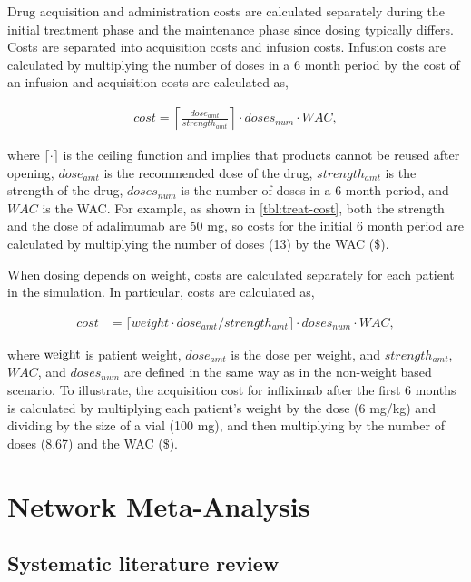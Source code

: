 \documentclass[11pt,final,fleqn]{article}\usepackage[]{graphicx}\usepackage[]{color}
\theoremstyle{plain}
\begin{document}
\begin{appendices}
Drug acquisition and administration costs are calculated separately during the initial treatment phase and the maintenance phase since dosing typically differs. Costs are separated into acquisition costs and infusion costs. Infusion costs are calculated by multiplying the number of doses in a 6 month period by the cost of an infusion and acquisition costs are calculated as,

\begin{align}
cost = \left\lceil\frac{dose_{amt}}{strength_{amt}}\right\rceil \cdot doses_{num} \cdot WAC,
\end{align}

where $\lceil\cdot\rceil$ is the ceiling function and implies that products cannot be reused after opening, $dose_{amt}$ is the recommended dose of the drug, $strength_{amt}$ is the strength of the drug, $doses_{num}$ is the number of doses in a 6 month period, and $WAC$ is the WAC. For example, as shown in \autoref{tbl:treat-cost}, both the strength and the dose of adalimumab are 50 mg, so costs for the initial 6 month period are calculated by multiplying the number of doses (13) by the WAC (\$).

When dosing depends on weight, costs are calculated separately for each patient in the simulation. In particular, costs are calculated as,

\begin{align}
cost &= \lceil weight \cdot dose_{amt}/strength_{amt}\rceil \cdot doses_{num} \cdot WAC,
\end{align}

where $\rm{weight}$ is patient weight, $dose_{amt}$ is the dose per weight, and $strength_{amt}$, $WAC$, and $doses_{num}$ are defined in the same way as in the non-weight based scenario. To illustrate, the acquisition cost for infliximab after the first 6 months is calculated by multiplying each patient's weight by the dose (6 mg/kg) and dividing by the size of a vial (100 mg), and then multiplying by the number of doses (8.67) and the WAC (\$).  

\section{Network Meta-Analysis}\label{appendix:NMA}

\subsection{Systematic literature review}\label{systematic-literature-review}


\end{appendices}
\end{document}
